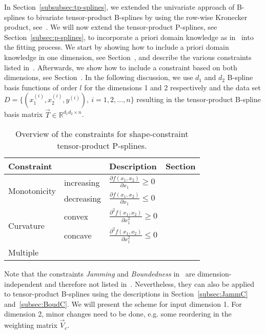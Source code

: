 In  Section~\ref{subsubsec:tp-splines}, we extended the univariate approach of B-splines to bivariate tensor-product B-splines by using the row-wise Kronecker product, see~. We will now extend the tensor-product P-splines, see Section~\ref{subsec:p-splines}, to incorporate a priori domain knowledge as in~ into the fitting process. We start by showing how to include a priori domain knowledge in one dimension, see Section~, and describe the various constraints listed in~. Afterwards, we show how to include a constraint based on both dimensions, see Section~. In the following discussion, we use $d_1$ and $d_2$ B-spline basis functions of order $l$ for the dimensions 1 and 2 respectively and the data set $D = \{(x_1^{(i)}, x_2^{(i)}, y^{(i)}), \ i=1,2,\dots,n\}$ resulting in the tensor-product B-spline basis matrix $\vec{T} \in \mathbb{R}^{d_1d_2 \times n}$.

\begin{table}[H]
	\centering
	\begin{tabular}{|l|ll|l|}
		\hline
		\textbf{Constraint}& & \textbf{Description}   & \textbf{Section}     \\ \hline \toprule
		\multirow{2}{*}{Monotonicity} & increasing & $ \frac{\partial f(x_1,x_2)}{\partial x_1} \ge 0$ 	& \pref{subsec:MIC-TP-one-dim} \\ \cline{2-4}
		& decreasing & $\frac{\partial f(x_1,x_2)}{\partial x_1} \le 0$  & \pref{subsec:MDC-TP-one-dim} \\ \hline	
		\multirow{2}{*}{Curvature}    & convex     & $\frac{\partial^2 f(x_1,x_2)}{\partial x_1^2}\ge 0$ 	& \pref{subsec:CONV-TP-one-dim} \\ \cline{2-4}
		& concave    & $\frac{\partial^2 f(x_1,x_2)}{\partial x_1^2}\le 0$ 	& \pref{subsec:CONC-TP-one-dim} \\ \hline 
		Multiple  & & & \pref{subsec:MULTICON-TP-one-dim} \\ \hline \bottomrule
	\end{tabular}
	\caption{Overview of the constraints for shape-constraint tensor-product P-splines.}
	\label{tab:constraint_overview_2d}
\end{table}

Note that the constraints \emph{Jamming} and \emph{Boundedness} in~ are dimension-independent and therefore not listed in~. Nevertheless, they can also be applied to tensor-product B-splines using the descriptions in Section~\ref{subsec:JammC} and~\ref{subsec:BoudC}. We will present the scheme for input dimension 1. For dimension 2, minor changes need to be done, e.g. some reordering in the weighting matrix $\vec{V}_c$. 

